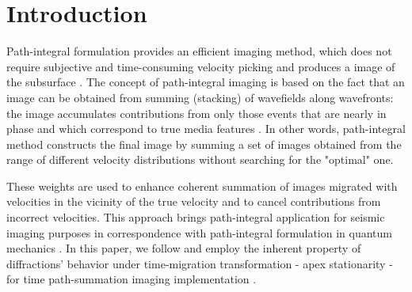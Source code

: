 \section{Introduction}

Path-integral formulation provides an efficient imaging method, which does not require subjective and 
time-consuming velocity picking and produces a image of the 
subsurface  \cite[]{landa_etal06, Burnett11}.
The concept of path-integral imaging is based on the
fact that an image can be obtained from summing (stacking) of wavefields along wavefronts: the image accumulates 
contributions from only those events that are nearly in phase and 
which correspond to  true media features \cite[]{keydar04, landa04}.
In other words, path-integral method constructs the final image by
summing a set of images obtained from the range of different velocity distributions
without searching for the "optimal" one.

These weights are used to enhance coherent summation of images migrated with
velocities in the vicinity of the true velocity and to cancel contributions from incorrect velocities.
This approach brings path-integral application for seismic imaging purposes in correspondence
with path-integral formulation in quantum mechanics \cite[]{feynman65}.
In this paper,
we follow \cite{Burnett11} and employ the inherent property of diffractions' behavior under time-migration
transformation - apex stationarity - for time path-summation imaging implementation .



